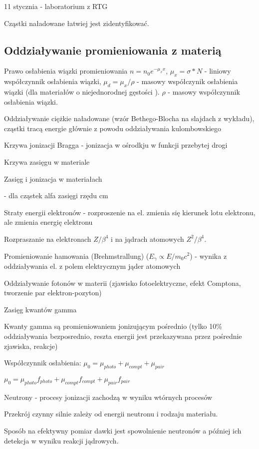 \documentclass{article}
\begin{document}
11 stycznia - laboratorium z RTG

Cząstki naładowane łatwiej jest zidentyfikować.

\subsection{Oddziaływanie promieniowania z materią}

Prawo osłabienia wiązki promieniowania $n = n_0 e^{-\mu_x x}$, $\mu_x = \sigma * N$ - liniowy współczynnik osłabienia wiązki, $\mu_d = \mu_x / \rho$ - masowy współczynik osłabienia wiązki (dla materiałów o niejednorodnej gęstości ). $\rho$ - masowy współczynnik osłabienia wiązki.

Oddziaływanie ciężkie naładowane (wzór Bethego-Blocha na slajdach z wykładu), cząstki tracą energie głównie z powodu oddziaływania kulombowskiego

Krzywa jonizacji Bragga - jonizacja w ośrodkju w funkcji przebytej drogi

Krzywa zasięgu w materiale

Zasięg i jonizacja w materiałach

- dla cząstek alfa zasięgi rzędu cm

Straty energii elektronów - rozproszenie na el. zmienia się kierunek lotu elektronu, ale zmienia energię elektronu

Rozpraszanie na elektronach $Z/\beta^4$ i na jądrach atomowych $Z^2/\beta^4$.

Promieniowanie hamowania (Brehmstrallung) ($E_\gamma \propto E/m_0c^2$) - wynika z oddziaływania el. z polem elektrycznym jąder atomowych

Oddziaływanie fotonów w materii (zjawisko fotoelektryczne, efekt Comptona, tworzenie par elektron-pozyton)

Zasięg kwantów gamma

Kwanty gamma są promieniowaniem jonizującym pośrednio (tylko 10\% oddziaływania bezposrednio, reszta energii jest przekazywana przez pośrednie zjawiska, reakcje)

Współczynnik osłabienia: $\mu_0 = \mu_{photo} + \mu_{compt} + \mu_{pair}$

$\mu_0 = \mu_{photo}f_{photo} + \mu_{compt}f_{compt} + \mu_{pair}f_{pair}$

Neutrony - procesy jonizacji zachodzą w wyniku wtórnych procesów

Przekrój czynny silnie zależy od energii neutronu i rodzaju materiału.

Sposób na efektywny pomiar dawki jest spowolnienie neutronów a później ich detekcja w wyniku reakcji jądrowych.
\end{document}
